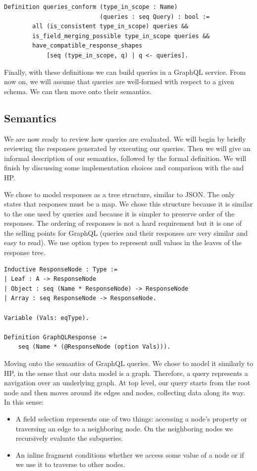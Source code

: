 \begin{verbatim}
Definition queries_conform (type_in_scope : Name)
                           (queries : seq Query) : bool :=
        all (is_consistent type_in_scope) queries &&
        is_field_merging_possible type_in_scope queries &&
        have_compatible_response_shapes
            [seq (type_in_scope, q) | q <- queries].
\end{verbatim}

Finally, with these definitions we can build queries in a GraphQL service. From now on, we will assume that queries are well-formed with respect to a given schema. We can then move onto their semantics.

\subsection{Semantics}\label{subsec:semantics}

We are now ready to review how queries are evaluated. We will begin by briefly reviewing the responses generated by executing our queries. Then we will give an informal description of our semantics, followed by the formal definition. We will finish by discussing some implementation choices and comparison with the \spec{} and HP.

We chose to model responses as a tree structure, similar to JSON. The \spec{} only states that responses must be a map. We chose this structure because it is similar to the one used by queries and because it is simpler to preserve order of the responses. The ordering of responses is not a hard requirement but it is one of the selling points for GraphQL (queries and their responses are very similar and easy to read). We use option types to represent null values in the leaves of the response tree.

\begin{verbatim}
Inductive ResponseNode : Type :=
| Leaf : A -> ResponseNode
| Object : seq (Name * ResponseNode) -> ResponseNode
| Array : seq ResponseNode -> ResponseNode.

Variable (Vals: eqType).

Definition GraphQLResponse :=
    seq (Name * (@ResponseNode (option Vals))).
\end{verbatim}

Moving onto the semantics of GraphQL queries. We chose to model it similarly to HP, in the sense that our data model is a graph. Therefore, a query represents a navigation over an underlying graph. At top level, our query starts from the root node and then moves around its edges and nodes, collecting data along its way. In this sense:
\begin{itemize}
    \item A field selection represents one of two things: accessing a node's property or traversing an edge to a neighboring node. On the neighboring nodes we recursively evaluate the subqueries.
    \item An inline fragment conditions whether we access some value of a node or if we use it to traverse to other nodes.
\end{itemize}

